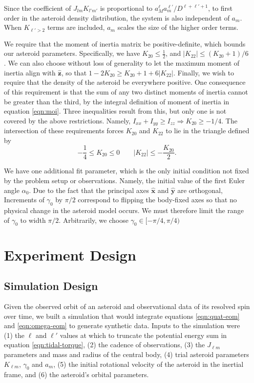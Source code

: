 \documentclass{aastex631}
\newcommand{\unit}[1]{\hat{\mathbf{#1}}}
\begin{document}
Since the coefficient of $J_{lm}K_{l'm'}$ is proportional to $a_M^\ell a_m^{\ell'} / D^{\ell+\ell'+1}$, to first order in the asteroid density distribution, the system is also independent of $a_m$. When $K_{\ell' > 2}$ terms are included, $a_m$ scales the size of the higher order terms.

We require that the moment of inertia matrix be positive-definite, which bounds our asteroid parameters. Specifically, we have $K_{20} \leq \frac{1}{2}$, and $|K_{22}| \leq (K_{20}+1)/6$. We can also choose without loss of generality to let the maximum moment of inertia align with $\unit z$, so that $1-2K_{20}\geq K_{20}+1+6|K_{22}|.$ Finally, we wish to require that the density of the asteroid be everywhere positive. One consequence of this requirement is that the sum of any two distinct moments of inertia cannot be greater than the third, by the integral definition of moment of inertia in equation \ref{eqn:moi}. Three inequalities result from this, but only one is not covered by the above restrictions. Namely, $I_{xx} + I_{yy}\geq I_{zz} \Rightarrow K_{20} \geq -1/4$. The intersection of these requirements forces $K_{20}$ and $K_{22}$ to lie in the triangle defined by
\begin{equation}
-\frac{1}{4} \leq K_{20} \leq 0 \qquad |K_{22}| \leq -\frac{K_{20}}{2}.
\label{eqn:parameter-bounds}
\end{equation}


We have one additional fit parameter, which is the only initial condition not fixed by the problem setup or observations. Namely, the initial value of the first Euler angle $\alpha_0$. Due to the fact that the principal axes $\unit x$ and $\unit y$ are orthogonal, Increments of $\gamma_0$ by $\pi/2$ correspond to flipping the body-fixed axes so that no physical change in the asteroid model occurs. We must therefore limit the range of $\gamma_0$ to width $\pi/2$. Arbitrarily, we choose $\gamma_0 \in [-\pi/4, \pi/4)$

\section{Experiment Design}
\subsection{Simulation Design}
\label{sec:simulation}
Given the observed orbit of an asteroid and observational data of its resolved spin over time, we built a simulation that would integrate equations \ref{eqn:quat-eom} and \ref{eqn:omega-eom} to generate synthetic data. Inputs to the simulation were (1) the $\ell$ and $\ell'$ values at which to truncate the potential energy sum in equation \ref{eqn:tidal-torque}, (2) the cadence of observations, (3) the $J_{\ell m}$ parameters and mass and radius of the central body, (4) trial asteroid parameters $K_{\ell m}$, $\gamma_0$ and $a_m$, (5) the initial rotational velocity of the asteroid in the inertial frame, and (6) the asteroid's orbital parameters.
\end{document}
